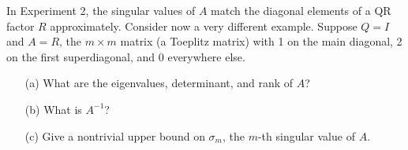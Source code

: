 \documentclass[10pt]{article}
\begin{document}
\maketitle

\begin{problem}[Exercise 9.2]
In Experiment 2, the singular values of \( A \) match the diagonal elements of a QR factor \( R \) approximately. Consider now a very different example. Suppose \( Q=I \) and \( A=R \), the \( m\times m \) matrix (a Toeplitz matrix) with 1 on the main diagonal, 2 on the first superdiagonal, and 0 everywhere else.
\begin{enumerate}
    \item[(a)] What are the eigenvalues, determinant, and rank of \( A \)?
    \item[(b)] What is \( A^{-1} \)?
    \item[(c)] Give a nontrivial upper bound on \( \sigma_m \), the \( m \)-th singular value of \( A \). 
\end{enumerate}
\end{problem}
\end{document}

